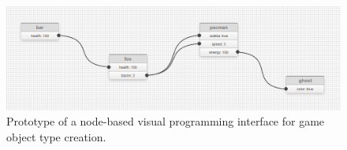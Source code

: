 \documentclass[
    phd,
    electronic,
    letterpaper,
    simplechapterheading,
    openany,
    parttop,
    lof,
]{byumsphd}
\begin{document}
\begin{figure}[H]
\bigskip
\centering
\includegraphics[width=\linewidth]{images/node-editor.png}
\caption{Prototype of a node-based visual programming interface for game object type creation.}
\label{fig:node-editor}
\end{figure}


\nocite{*} 




\end{document}
